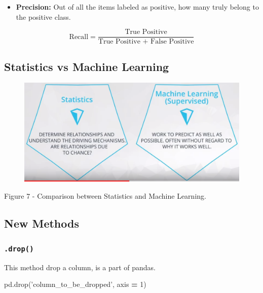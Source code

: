 \documentclass[]{book}
\newenvironment{Shaded}{\begin{snugshade}}{\end{snugshade}}
\newcommand{\DecValTok}[1]{\textcolor[rgb]{0.00,0.00,0.81}{#1}}
\newcommand{\StringTok}[1]{\textcolor[rgb]{0.31,0.60,0.02}{#1}}
\newcommand{\OperatorTok}[1]{\textcolor[rgb]{0.81,0.36,0.00}{\textbf{#1}}}
\newcommand{\NormalTok}[1]{#1}
\providecommand{\tightlist}{%
  \setlength{\itemsep}{0pt}\setlength{\parskip}{0pt}}
\begin{document}
\begin{itemize}
\tightlist
\item
  \textbf{Precision:} Out of all the items labeled as positive, how many
  truly belong to the positive class.
\end{itemize}

\[\text{Recall} = \frac{\text{True Positive}}{\text{True Positive + False Positive}}\]

\subsection{Statistics vs Machine
Learning}\label{statistics-vs-machine-learning}

\begin{figure}
\centering
\includegraphics{01-img/c4_l16_07.png}
\caption{}
\end{figure}

Figure 7 - Comparison between Statistics and Machine Learning.

\subsection{New Methods}\label{new-methods-1}

\subsubsection{\texorpdfstring{\texttt{.drop()}}{.drop()}}\label{drop}

This method drop a column, is a part of pandas.

\begin{Shaded}
\begin{Highlighting}[]
\NormalTok{pd.drop(}\StringTok{'column_to_be_dropped'}\NormalTok{, axis }\OperatorTok{=} \DecValTok{1}\NormalTok{)}
\end{Highlighting}
\end{Shaded}
\end{document}
